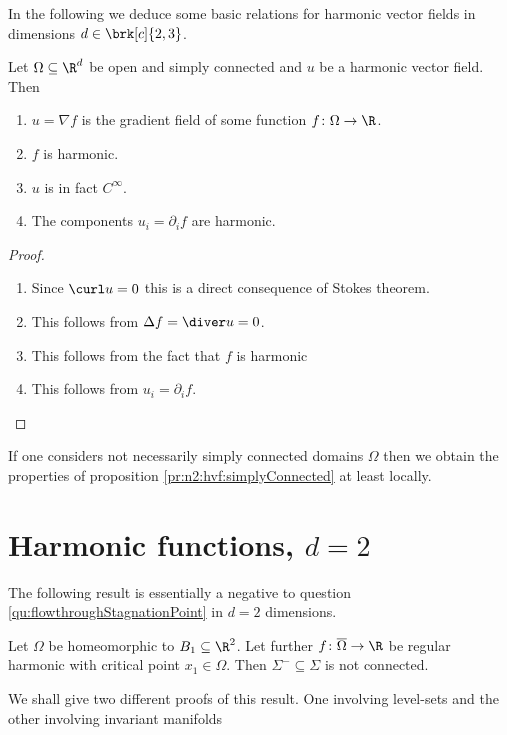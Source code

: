 In the following we deduce some basic relations for harmonic vector fields in dimensions $d\in\brk[c]{2,3}$.
\begin{proposition}\label{pr:n2:hvf:simplyConnected}
  Let $\Omega\subseteq\R^d$ be open and simply connected and $u$ be a harmonic vector field. Then
  \begin{enumerate}
    \item 
    $u=\nabla f$ is the gradient field of some
    function $f\colon\Omega\to\R$.
    \item  $f$ is harmonic.
    \item $u$ is in fact $C^\infty$.
    \item The components $u_i=\partial_if$ are harmonic.
  \end{enumerate}
\end{proposition}
\begin{proof}
  \begin{enumerate}
    \item 
    Since $\curl u =0$ this is a direct consequence of Stokes theorem.
    \item This follows from $\Delta f = \diver u=0$.
    \item This follows from the fact that $f$ is harmonic
    \item This follows from $u_i=\partial_if$.
  \end{enumerate}
\end{proof}

If one considers not necessarily simply connected domains $\Omega$ then we obtain the
properties of proposition \ref{pr:n2:hvf:simplyConnected} at least locally.

\chapter{Harmonic functions, $d=2$}

The following result is essentially a negative to question \ref{qu:flowthroughStagnationPoint} in $d=2$ dimensions.
\begin{proposition}\label{pr:n2:hf:nonExistence}
  Let $\Omega$ be homeomorphic to $B_1\subseteq\R^2$. Let further $f\colon\overline{\Omega}\to\R$ be regular harmonic  
  with critical point $x_1\in\Omega$. Then $\Sigma^-\subseteq\Sigma$ is not connected.
\end{proposition}
We shall give two different proofs of this result. One involving level-sets and the other involving invariant manifolds

